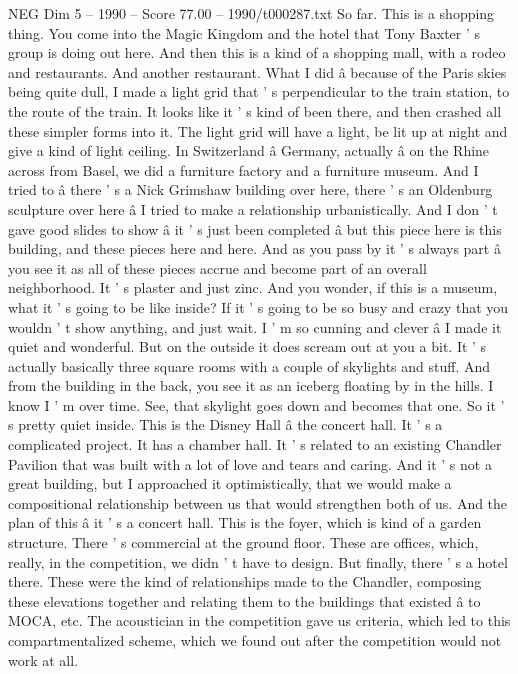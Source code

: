 \begin{textsample}{NEG Dim 5 – 1990 – Score 77.00 – 1990/t000287.txt}
So far.
This is a shopping thing.
You come into the Magic Kingdom and the hotel that Tony Baxter ' s group is doing out here.
And then this is a kind of a shopping mall, with a rodeo and restaurants.
And another restaurant.
What I did â because of the Paris skies being quite dull, I made a light grid that ' s perpendicular to the train station, to the route of the train.
It looks like it ' s kind of been there, and then crashed all these simpler forms into it.
The light grid will have a light, be lit up at night and give a kind of light ceiling.
In Switzerland â Germany, actually â on the Rhine across from Basel, we did a furniture factory and a furniture museum.
And I tried to â there ' s a Nick Grimshaw building over here, there ' s an Oldenburg sculpture over here â I tried to make a relationship urbanistically.
And I don ' t gave good slides to show â it ' s just been completed â but this piece here is this building, and these pieces here and here.
And as you pass by it ' s always part â you see it as all of these pieces accrue and become part of an overall neighborhood.
It ' s plaster and just zinc.
And you wonder, if this is a museum, what it ' s going to be like inside?
If it ' s going to be so busy and crazy that you wouldn ' t show anything, and just wait.
I ' m so cunning and clever â I made it quiet and wonderful.
But on the outside it does scream out at you a bit.
It ' s actually basically three square rooms with a couple of skylights and stuff.
And from the building in the back, you see it as an iceberg floating by in the hills.
I know I ' m over time.
See, that skylight goes down and becomes that one.
So it ' s pretty quiet inside.
This is the Disney Hall â the concert hall.
It ' s a complicated project.
It has a chamber hall.
It ' s related to an existing Chandler Pavilion that was built with a lot of love and tears and caring.
And it ' s not a great building, but I approached it optimistically, that we would make a compositional relationship between us that would strengthen both of us.
And the plan of this â it ' s a concert hall.
This is the foyer, which is kind of a garden structure.
There ' s commercial at the ground floor.
These are offices, which, really, in the competition, we didn ' t have to design.
But finally, there ' s a hotel there.
These were the kind of relationships made to the Chandler, composing these elevations together and relating them to the buildings that existed â to MOCA, etc.
The acoustician in the competition gave us criteria, which led to this compartmentalized scheme, which we found out after the competition would not work at all.

\end{textsample}
